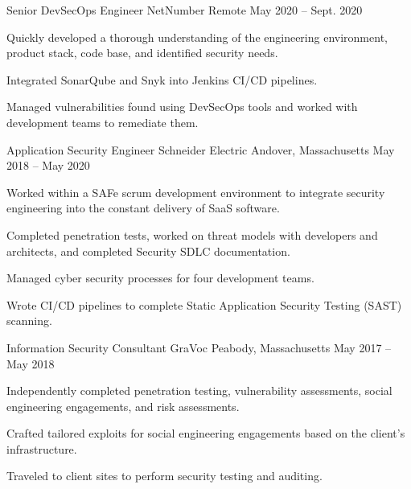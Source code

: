 \begin{cventries}
  \cventry
    {Senior DevSecOps Engineer} %
    {NetNumber} %
    {Remote} %
    {May 2020 – Sept. 2020} %
    {
      \begin{cvitems} %
        \item {
          Quickly developed a thorough understanding of the engineering environment, product stack, code base, and identified security needs.
        }
        \item {
          Integrated SonarQube and Snyk into Jenkins CI/CD pipelines.
        }
        \item {
          Managed vulnerabilities found using DevSecOps tools and worked with development teams to remediate them.
        }
      \end{cvitems}
    }

  \cventry
    {Application Security Engineer} %
    {Schneider Electric} %
    {Andover, Massachusetts} %
    {May 2018 – May 2020} %
    {
      \begin{cvitems} %
        \item {
          Worked within a SAFe scrum development environment to integrate security engineering into the constant delivery of SaaS software.
        }
        \item {
          Completed penetration tests, worked on threat models with developers and architects, and completed Security SDLC documentation.
        }
        \item {
          Managed cyber security processes for four development teams.
        }
        \item {
          Wrote CI/CD pipelines to complete Static Application Security Testing (SAST) scanning.
        }
      \end{cvitems}
    }

  \cventry
    {Information Security Consultant} %
    {GraVoc} %
    {Peabody, Massachusetts} %
    {May 2017 – May 2018} %
    {
      \begin{cvitems} %
        \item {
          Independently completed penetration testing, vulnerability assessments, social engineering engagements, and risk assessments.
        }
        \item {
          Crafted tailored exploits for social engineering engagements based on the client's infrastructure.
        }
        \item {
          Traveled to client sites to perform security testing and auditing.
        }
      \end{cvitems}
    }
\end{cventries}
